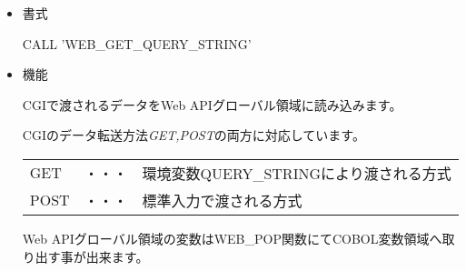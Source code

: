 
\begin{itemize}
\item{書式}

CALL 'WEB\_GET\_QUERY\_STRING'

\item{機能}

CGIで渡されるデータをWeb APIグローバル領域に読み込みます。

CGIのデータ転送方法{\it GET,POST}の両方に対応しています。

{\footnotesize
\begin{tabular}{lcl}
GET & ・・・ & 環境変数QUERY\_STRINGにより渡される方式 \\
POST & ・・・ &標準入力で渡される方式\\
\end{tabular}
}

\vspace{1em}

Web APIグローバル領域の変数はWEB\_POP関数にてCOBOL変数領域へ取り出す事が出来ます。


\end{itemize}